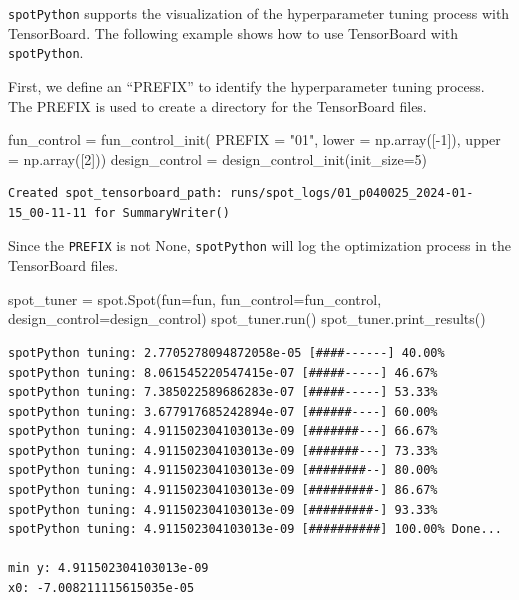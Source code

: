 \documentclass[
  letterpaper,
  DIV=11,
  numbers=noendperiod]{scrreprt}
\newenvironment{Shaded}{\begin{snugshade}}{\end{snugshade}}
\newcommand{\DecValTok}[1]{\textcolor[rgb]{0.68,0.00,0.00}{#1}}
\newcommand{\NormalTok}[1]{\textcolor[rgb]{0.00,0.23,0.31}{#1}}
\newcommand{\OperatorTok}[1]{\textcolor[rgb]{0.37,0.37,0.37}{#1}}
\newcommand{\StringTok}[1]{\textcolor[rgb]{0.13,0.47,0.30}{#1}}
\begin{document}
\texttt{spotPython} supports the visualization of the hyperparameter
tuning process with TensorBoard. The following example shows how to use
TensorBoard with \texttt{spotPython}.

First, we define an ``PREFIX'' to identify the hyperparameter tuning
process. The PREFIX is used to create a directory for the TensorBoard
files.

\begin{Shaded}
\begin{Highlighting}[]
\NormalTok{fun\_control }\OperatorTok{=}\NormalTok{ fun\_control\_init(}
\NormalTok{    PREFIX }\OperatorTok{=} \StringTok{"01"}\NormalTok{,}
\NormalTok{    lower }\OperatorTok{=}\NormalTok{ np.array([}\OperatorTok{{-}}\DecValTok{1}\NormalTok{]),}
\NormalTok{    upper }\OperatorTok{=}\NormalTok{ np.array([}\DecValTok{2}\NormalTok{]))}
\NormalTok{design\_control }\OperatorTok{=}\NormalTok{ design\_control\_init(init\_size}\OperatorTok{=}\DecValTok{5}\NormalTok{)}
\end{Highlighting}
\end{Shaded}

\begin{verbatim}
Created spot_tensorboard_path: runs/spot_logs/01_p040025_2024-01-15_00-11-11 for SummaryWriter()
\end{verbatim}

Since the \texttt{PREFIX} is not None, \texttt{spotPython} will log the
optimization process in the TensorBoard files.

\begin{Shaded}
\begin{Highlighting}[]
\NormalTok{spot\_tuner }\OperatorTok{=}\NormalTok{ spot.Spot(fun}\OperatorTok{=}\NormalTok{fun,}
\NormalTok{                   fun\_control}\OperatorTok{=}\NormalTok{fun\_control,}
\NormalTok{                   design\_control}\OperatorTok{=}\NormalTok{design\_control)}
\NormalTok{spot\_tuner.run()}
\NormalTok{spot\_tuner.print\_results()}
\end{Highlighting}
\end{Shaded}

\begin{verbatim}
spotPython tuning: 2.7705278094872058e-05 [####------] 40.00% 
spotPython tuning: 8.061545220547415e-07 [#####-----] 46.67% 
spotPython tuning: 7.385022589686283e-07 [#####-----] 53.33% 
spotPython tuning: 3.677917685242894e-07 [######----] 60.00% 
spotPython tuning: 4.911502304103013e-09 [#######---] 66.67% 
spotPython tuning: 4.911502304103013e-09 [#######---] 73.33% 
spotPython tuning: 4.911502304103013e-09 [########--] 80.00% 
spotPython tuning: 4.911502304103013e-09 [#########-] 86.67% 
spotPython tuning: 4.911502304103013e-09 [#########-] 93.33% 
spotPython tuning: 4.911502304103013e-09 [##########] 100.00% Done...

min y: 4.911502304103013e-09
x0: -7.008211115615035e-05
\end{verbatim}
\end{document}
